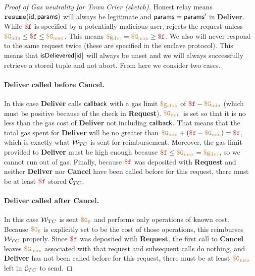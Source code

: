 \begin{proof}[Proof of Gas neutrality for Town Crier (sketch)]
Honest relay means $\texttt{resume}({\sf id}, {\sf params})$ will always be legitimate and ${\sf params} = {\sf params}'$ in {\bf Deliver}.
While $\fee$ is specified by a potentially malicious user, \tcont rejects the request unless $\constgasmin \leq \fee \leq \constgasmax$.
This means $\gasdeliver = \constgasmax \geq \fee$.
We also will never respond to the same request twice (these are specified in the enclave protocol).
This means that ${\sf isDelievered}[{\sf id}]$ will always be unset and we will always successfully retrieve a stored tuple and not abort.
From here we consider two cases.

\paragraph{Deliver called before Cancel.}
In this case {\bf Deliver} calls ${\sf callback}$ with a gas limit $\tt {\color{brown} \$g_\text{clbk} }$ of $\fee - \constgasmin$ (which must be positive because of the check in {\bf Request}).
$\tt {\color{brown} \$G_\text{min} }$ is set so that it is no less than the gas cost of {\bf Deliver} not including ${\sf callback}$.
That means that the total gas spent for {\bf Deliver} will be no greater than $\constgasmin + (\fee - \constgasmin) = \fee$, which is exactly what ${\cal W}_{TC}$ is sent for reimbursement.
Moreover, the gas limit provided to {\bf Deliver} must be high enough because $\fee \leq \constgasmax = \gasdeliver$, so we cannot run out of gas.
Finally, because $\fee$ was deposited with {\bf Request} and neither {\bf Deliver} nor {\bf Cancel} have been called before for this request, there must be at least $\fee$ stored ${\cal C}_{TC}$.

\paragraph{Deliver called after Cancel.}
In this case ${\cal W}_{TC}$ is sent $\tt {\color{brown} \$G_\emptyset }$ and performs only operations of known cost.
Because $\tt {\color{brown} \$G_\emptyset }$ is explicitly set to be the cost of those operations, this reimburses ${\cal W}_{TC}$ properly.
Since $\fee$ was deposited with {\bf Request}, the first call to {\bf Cancel} leaves $\tt {\color{brown} \$G_\text{max} }$ associated with that request and subsequent calls do nothing,
and {\bf Deliver} has not been called before for this request, there must be at least $\tt {\color{brown} \$G_\text{max} }$ left in ${\cal C}_{TC}$ to send.
\end{proof}





